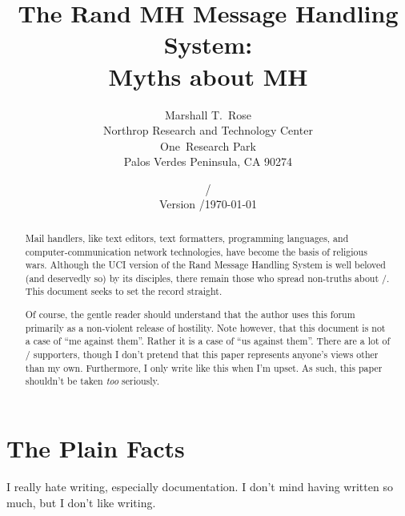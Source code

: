 

\draftfalse


\setcounter{page}{0}
\pagestyle{empty}



\title{The Rand MH Message Handling System:\\
	Myths about MH}
\author{Marshall T.~Rose\\
	Northrop Research and Technology Center\\
	One~Research Park\\
	Palos Verdes Peninsula, CA  90274}
\date{\ifdraft \versiondate/\\ Version \versiontag/\else \today\fi}
\maketitle
{}%

\begin{abstract}
\noindent Mail handlers, like text editors, text formatters,
programming languages, and computer-communication network technologies,
have become the basis of religious wars.
Although the UCI version of the Rand Message Handling System is well beloved
(and deservedly so) by its disciples,
there remain those who spread non-truths about \MH/.
This document seeks to set the record straight.

Of course,
the gentle reader should understand that the author uses this forum primarily
as a non-violent release of hostility.
Note however,
that this document is not a case of ``me against them''.
Rather it is a case of ``us against them''.
There are a lot of \MH/ supporters,
though
I don't pretend that this paper represents anyone's views other than my own.
Furthermore,
I only write like this when I'm upset.
As such,
this paper shouldn't be taken {\em too\/} seriously.
\end{abstract}

\bop\pagestyle{plain}

\section*	{The Plain Facts}
I really hate writing, especially documentation.
I don't mind having written so much, but I don't like writing.

